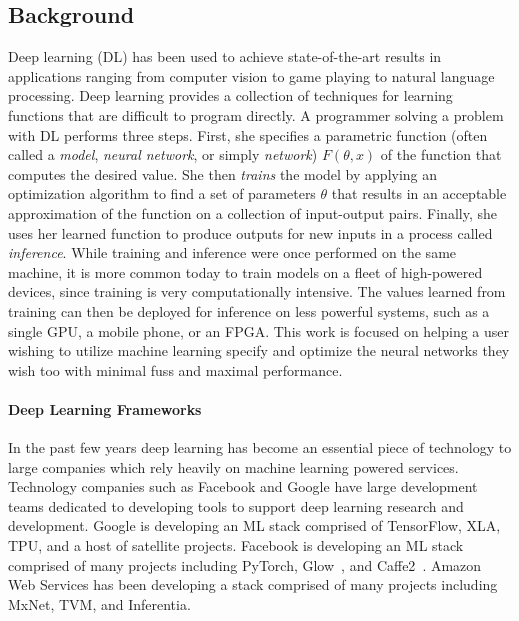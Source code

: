 \subsection{Background}

Deep learning (DL) has been used to achieve state-of-the-art results in
  applications ranging from computer vision to game
  playing to natural language processing.
Deep learning provides a collection of techniques for learning functions that are difficult
  to program directly.
A programmer solving a problem with DL performs three steps.
First, she specifies a parametric function (often called a \textit{model},
  \textit{neural network}, or simply \textit{network}) $F(\theta, x)$ of the function
  that computes the desired value.
She then \textit{trains} the model by applying an optimization algorithm to find a set of
  parameters $\theta$ that results in an acceptable approximation of the function on a
  collection of input-output pairs.
Finally, she uses her learned function to produce outputs for new inputs in
  a process called \textit{inference}.
While training and inference were once performed on the same machine,
  it is more common today to train models on a fleet of high-powered devices,
  since training is very computationally intensive.
The values learned from training can then be deployed for inference on less powerful systems,
  such as a single GPU, a mobile phone, or an FPGA.
This work is focused on helping a user wishing to utilize machine learning specify and optimize
  the neural networks they wish too with minimal fuss and maximal performance.

\paragraph{Deep Learning Frameworks}

In the past few years deep learning has become an essential
  piece of technology to large companies which rely heavily
  on machine learning powered services.
Technology companies such as Facebook and Google have large development
  teams dedicated to developing tools to support deep learning research
  and development.
Google is developing an ML stack comprised of
  TensorFlow, XLA, TPU, and a host of satellite projects.
Facebook is developing an ML stack comprised of
  many projects including PyTorch,
  Glow~\citep{glow}, and Caffe2~\citep{pytorch_caffe2}.
Amazon Web Services has been developing a stack
  comprised of many projects including
  MxNet, TVM, and Inferentia.

